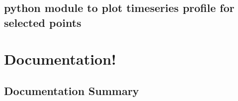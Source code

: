 \documentclass[letterpaper,10pt]{sphinxmanual}
\begin{document}
\section{python module to plot timeseries profile for selected points}
\label{\detokenize{README:python-module-to-plot-timeseries-profile-for-selected-points}}
\begin{sphinxVerbatim}[commandchars=\\\{\}]
     

\end{sphinxVerbatim}


\chapter{Documentation!}
\label{\detokenize{index:documentation}}
\sphinxstepscope


\section{Documentation Summary}
\label{\detokenize{api:documentation-summary}}\label{\detokenize{api::doc}}
\end{document}
